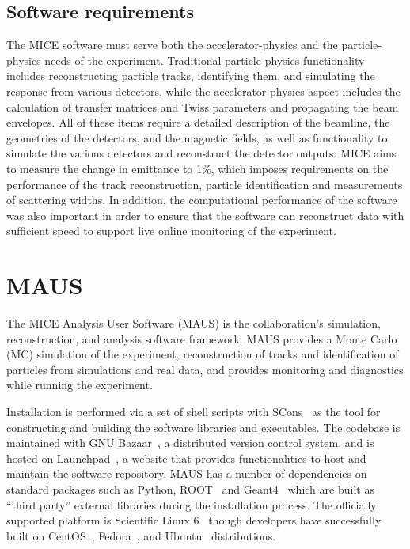 \documentclass[11pt,a4paper]{article}
\begin{document}
\subsection{Software requirements} \label{sec:requirements}

The MICE software must serve both the accelerator-physics and the particle-physics needs of the experiment. Traditional particle-physics functionality includes reconstructing particle tracks, identifying them, and simulating the response from various detectors, while the accelerator-physics aspect includes the calculation of transfer matrices and Twiss parameters and propagating the beam envelopes. All of these items require a detailed description of the beamline, the geometries of the detectors, and the magnetic fields, as well as functionality to simulate the various detectors and reconstruct the detector outputs. MICE aims to measure the change in emittance to 1\%, which imposes requirements on the performance of the track reconstruction, particle identification and measurements of scattering widths. In addition, the computational performance of the software was also important in order to ensure that the software can reconstruct data with sufficient speed to support live online monitoring of the experiment.


\section{MAUS}\label{sec:maus}

The MICE  Analysis User Software (MAUS) is the collaboration's simulation, reconstruction, and  analysis software framework. MAUS provides a Monte Carlo (MC) simulation of the experiment, reconstruction of tracks and identification of particles from simulations and real data, and provides monitoring and diagnostics while running the experiment.

Installation is performed via a set of shell scripts with SCons~\cite{SCONS} as the tool for constructing and building the software libraries and executables. The codebase is maintained with GNU Bazaar~\cite{bazaar}, a distributed version control system, and is hosted on Launchpad~\cite{launchpad}, a website that provides functionalities to host and maintain the software repository. MAUS has a number of dependencies on standard packages such as Python, ROOT~\cite{ROOT} and Geant4~\cite{GEANT4} which are built as ``third party'' external libraries during the installation process.  The officially supported platform is Scientific Linux 6~\cite{scilinux} though developers have successfully built on CentOS~\cite{centos}, Fedora~\cite{fedora}, and Ubuntu~\cite{ubuntu} distributions.
\end{document}

